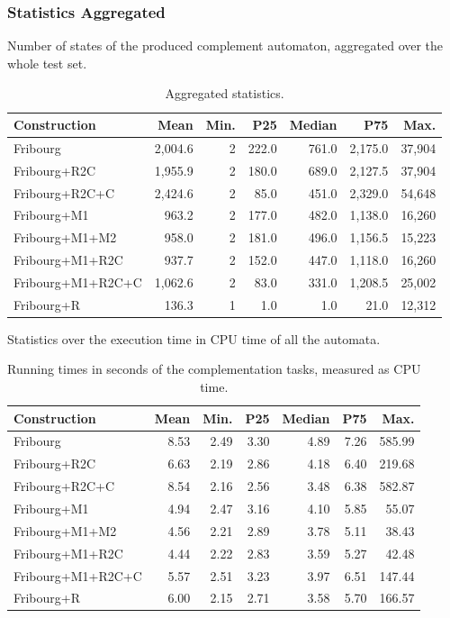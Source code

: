 \subsubsection{Statistics Aggregated}

Number of states of the produced complement automaton, aggregated over the whole test set.

\begin{table}[ht]
\centering
\begin{tabular}{lrrrrrr}
  \hline
Construction & Mean & Min. & P25 & Median & P75 & Max. \\ 
  \hline
Fribourg & 2,004.6 & 2 & 222.0 & 761.0 & 2,175.0 & 37,904 \\ 
  Fribourg+R2C & 1,955.9 & 2 & 180.0 & 689.0 & 2,127.5 & 37,904 \\ 
  Fribourg+R2C+C & 2,424.6 & 2 & 85.0 & 451.0 & 2,329.0 & 54,648 \\ 
  Fribourg+M1 & 963.2 & 2 & 177.0 & 482.0 & 1,138.0 & 16,260 \\ 
  Fribourg+M1+M2 & 958.0 & 2 & 181.0 & 496.0 & 1,156.5 & 15,223 \\ 
  Fribourg+M1+R2C & 937.7 & 2 & 152.0 & 447.0 & 1,118.0 & 16,260 \\ 
  Fribourg+M1+R2C+C & 1,062.6 & 2 & 83.0 & 331.0 & 1,208.5 & 25,002 \\ 
  Fribourg+R & 136.3 & 1 & 1.0 & 1.0 & 21.0 & 12,312 \\ 
   \hline
\end{tabular}
\caption{Aggregated statistics.}
\end{table}

Statistics over the execution time in CPU time of all the automata.

\begin{table}[ht]
\centering
\begin{tabular}{lrrrrrr}
  \hline
Construction & Mean & Min. & P25 & Median & P75 & Max. \\ 
  \hline
Fribourg & 8.53 & 2.49 & 3.30 & 4.89 & 7.26 & 585.99 \\ 
  Fribourg+R2C & 6.63 & 2.19 & 2.86 & 4.18 & 6.40 & 219.68 \\ 
  Fribourg+R2C+C & 8.54 & 2.16 & 2.56 & 3.48 & 6.38 & 582.87 \\ 
  Fribourg+M1 & 4.94 & 2.47 & 3.16 & 4.10 & 5.85 & 55.07 \\ 
  Fribourg+M1+M2 & 4.56 & 2.21 & 2.89 & 3.78 & 5.11 & 38.43 \\ 
  Fribourg+M1+R2C & 4.44 & 2.22 & 2.83 & 3.59 & 5.27 & 42.48 \\ 
  Fribourg+M1+R2C+C & 5.57 & 2.51 & 3.23 & 3.97 & 6.51 & 147.44 \\ 
  Fribourg+R & 6.00 & 2.15 & 2.71 & 3.58 & 5.70 & 166.57 \\ 
   \hline
\end{tabular}
\caption{Running times in seconds of the complementation tasks, measured as CPU time.}
\end{table}

